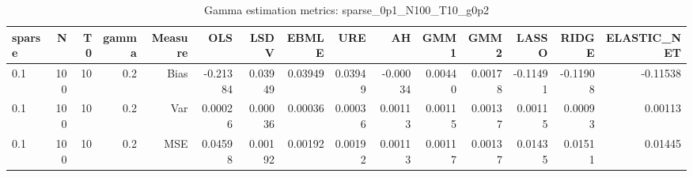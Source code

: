 \begin{table}[!htbp]\centering
\caption{Gamma estimation metrics: sparse_0p1_N100_T10_g0p2}
\label{tab:table1_sparse_0p1_N100_T10_g0p2}
\begin{tabular}{lrrrrrrrrrrrrrr}
\hline
sparse & N & T0 & gamma & Measure & OLS & LSDV & EBMLE & URE & AH & GMM1 & GMM2 & LASSO & RIDGE & ELASTIC_NET \\
\hline
0.1 & 100 & 10 & 0.2 & Bias & -0.21384 & 0.03949 & 0.03949 & 0.03949 & -0.00034 & 0.00440 & 0.00178 & -0.11491 & -0.11908 & -0.11538 \\
0.1 & 100 & 10 & 0.2 & Var & 0.00026 & 0.00036 & 0.00036 & 0.00036 & 0.00113 & 0.00115 & 0.00137 & 0.00115 & 0.00093 & 0.00113 \\
0.1 & 100 & 10 & 0.2 & MSE & 0.04598 & 0.00192 & 0.00192 & 0.00192 & 0.00113 & 0.00117 & 0.00137 & 0.01435 & 0.01511 & 0.01445 \\
\hline
\end{tabular}
\end{table}

